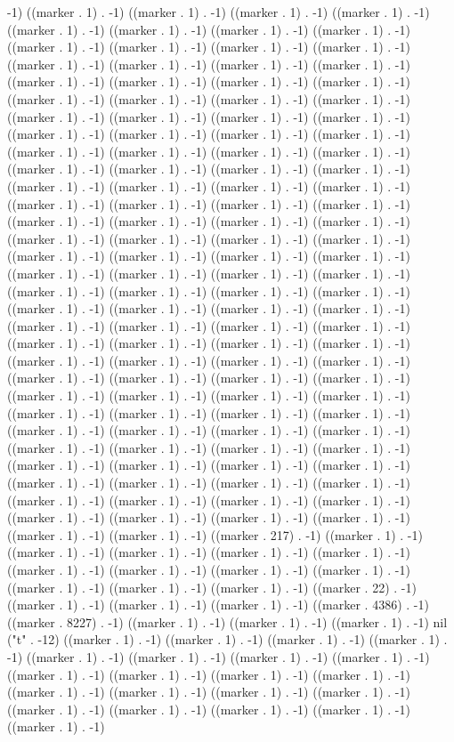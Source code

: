 -1) ((marker . 1) . -1) ((marker . 1) . -1) ((marker . 1) . -1) ((marker . 1) . -1) ((marker . 1) . -1) ((marker . 1) . -1) ((marker . 1) . -1) ((marker . 1) . -1) ((marker . 1) . -1) ((marker . 1) . -1) ((marker . 1) . -1) ((marker . 1) . -1) ((marker . 1) . -1) ((marker . 1) . -1) ((marker . 1) . -1) ((marker . 1) . -1) ((marker . 1) . -1) ((marker . 1) . -1) ((marker . 1) . -1) ((marker . 1) . -1) ((marker . 1) . -1) ((marker . 1) . -1) ((marker . 1) . -1) ((marker . 1) . -1) ((marker . 1) . -1) ((marker . 1) . -1) ((marker . 1) . -1) ((marker . 1) . -1) ((marker . 1) . -1) ((marker . 1) . -1) ((marker . 1) . -1) ((marker . 1) . -1) ((marker . 1) . -1) ((marker . 1) . -1) ((marker . 1) . -1) ((marker . 1) . -1) ((marker . 1) . -1) ((marker . 1) . -1) ((marker . 1) . -1) ((marker . 1) . -1) ((marker . 1) . -1) ((marker . 1) . -1) ((marker . 1) . -1) ((marker . 1) . -1) ((marker . 1) . -1) ((marker . 1) . -1) ((marker . 1) . -1) ((marker . 1) . -1) ((marker . 1) . -1) ((marker . 1) . -1) ((marker . 1) . -1) ((marker . 1) . -1) ((marker . 1) . -1) ((marker . 1) . -1) ((marker . 1) . -1) ((marker . 1) . -1) ((marker . 1) . -1) ((marker . 1) . -1) ((marker . 1) . -1) ((marker . 1) . -1) ((marker . 1) . -1) ((marker . 1) . -1) ((marker . 1) . -1) ((marker . 1) . -1) ((marker . 1) . -1) ((marker . 1) . -1) ((marker . 1) . -1) ((marker . 1) . -1) ((marker . 1) . -1) ((marker . 1) . -1) ((marker . 1) . -1) ((marker . 1) . -1) ((marker . 1) . -1) ((marker . 1) . -1) ((marker . 1) . -1) ((marker . 1) . -1) ((marker . 1) . -1) ((marker . 1) . -1) ((marker . 1) . -1) ((marker . 1) . -1) ((marker . 1) . -1) ((marker . 1) . -1) ((marker . 1) . -1) ((marker . 1) . -1) ((marker . 1) . -1) ((marker . 1) . -1) ((marker . 1) . -1) ((marker . 1) . -1) ((marker . 1) . -1) ((marker . 1) . -1) ((marker . 1) . -1) ((marker . 1) . -1) ((marker . 1) . -1) ((marker . 1) . -1) ((marker . 1) . -1) ((marker . 1) . -1) ((marker . 1) . -1) ((marker . 1) . -1) ((marker . 1) . -1) ((marker . 1) . -1) ((marker . 1) . -1) ((marker . 1) . -1) ((marker . 1) . -1) ((marker . 1) . -1) ((marker . 1) . -1) ((marker . 1) . -1) ((marker . 1) . -1) ((marker . 1) . -1) ((marker . 1) . -1) ((marker . 1) . -1) ((marker . 1) . -1) ((marker . 1) . -1) ((marker . 1) . -1) ((marker . 1) . -1) ((marker . 1) . -1) ((marker . 1) . -1) ((marker . 1) . -1) ((marker . 1) . -1) ((marker . 1) . -1) ((marker . 1) . -1) ((marker . 1) . -1) ((marker . 1) . -1) ((marker . 217) . -1) ((marker . 1) . -1) ((marker . 1) . -1) ((marker . 1) . -1) ((marker . 1) . -1) ((marker . 1) . -1) ((marker . 1) . -1) ((marker . 1) . -1) ((marker . 1) . -1) ((marker . 1) . -1) ((marker . 1) . -1) ((marker . 1) . -1) ((marker . 1) . -1) ((marker . 22) . -1) ((marker . 1) . -1) ((marker . 1) . -1) ((marker . 1) . -1) ((marker . 4386) . -1) ((marker . 8227) . -1) ((marker . 1) . -1) ((marker . 1) . -1) ((marker . 1) . -1) nil ("t" . -12) ((marker . 1) . -1) ((marker . 1) . -1) ((marker . 1) . -1) ((marker . 1) . -1) ((marker . 1) . -1) ((marker . 1) . -1) ((marker . 1) . -1) ((marker . 1) . -1) ((marker . 1) . -1) ((marker . 1) . -1) ((marker . 1) . -1) ((marker . 1) . -1) ((marker . 1) . -1) ((marker . 1) . -1) ((marker . 1) . -1) ((marker . 1) . -1) ((marker . 1) . -1) ((marker . 1) . -1) ((marker . 1) . -1) ((marker . 1) . -1) ((marker . 1) . -1) 
